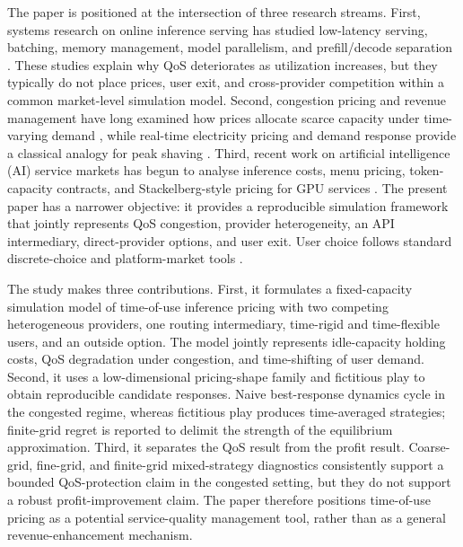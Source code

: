 \documentclass[11pt,a4paper]{article}
\begin{document}
The paper is positioned at the intersection of three research streams. First, systems research on online inference serving has studied low-latency serving, batching, memory management, model parallelism, and prefill/decode separation \cite{crankshaw2017clipper,gujarati2020clockwork,romero2021infaas,yu2022orca,li2023alpaserve,sheng2023flexgen,kwon2023pagedattention,agrawal2024sarathiserve,patel2024splitwise,zhong2024distserve,agrawal2024vidur}. These studies explain why QoS deteriorates as utilization increases, but they typically do not place prices, user exit, and cross-provider competition within a common market-level simulation model. Second, congestion pricing and revenue management have long examined how prices allocate scarce capacity under time-varying demand \cite{vickrey1969congestion,arnott1990bottleneck,gallego1994dynamic,elmaghraby2003dynamic,bitran2003overview,talluri2004revenue,phillips2005pricing}, while real-time electricity pricing and demand response provide a classical analogy for peak shaving \cite{schweppe1988spot,borenstein2005long,allcott2011rethinking,siano2014demand}. Third, recent work on artificial intelligence (AI) service markets has begun to analyse inference costs, menu pricing, token-capacity contracts, and Stackelberg-style pricing for GPU services \cite{demirer2025emerging,erdil2025inference,bergemann2025menu,guo2026prillm,yan2026stackelberg,cunningham2026token,liu2026locational}. The present paper has a narrower objective: it provides a reproducible simulation framework that jointly represents QoS congestion, provider heterogeneity, an API intermediary, direct-provider options, and user exit. User choice follows standard discrete-choice and platform-market tools \cite{mcfadden1974conditional,anderson1992discrete,train2009discrete,rochet2003platform}.

The study makes three contributions. First, it formulates a fixed-capacity simulation model of time-of-use inference pricing with two competing heterogeneous providers, one routing intermediary, time-rigid and time-flexible users, and an outside option. The model jointly represents idle-capacity holding costs, QoS degradation under congestion, and time-shifting of user demand. Second, it uses a low-dimensional pricing-shape family and fictitious play to obtain reproducible candidate responses. Naive best-response dynamics cycle in the congested regime, whereas fictitious play produces time-averaged strategies; finite-grid regret is reported to delimit the strength of the equilibrium approximation. Third, it separates the QoS result from the profit result. Coarse-grid, fine-grid, and finite-grid mixed-strategy diagnostics consistently support a bounded QoS-protection claim in the congested setting, but they do not support a robust profit-improvement claim. The paper therefore positions time-of-use pricing as a potential service-quality management tool, rather than as a general revenue-enhancement mechanism.
\end{document}
